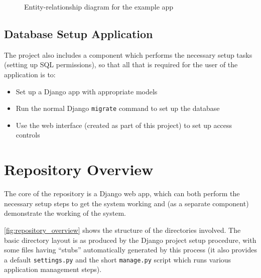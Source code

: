 \documentclass[12pt]{report}
\begin{document}
\begin{figure}[h]
\begin{center}
  \end{center}
  \caption{Entity-relationship diagram for the example app}
  \label{fig:entity-relationship}
\end{figure}

\subsection{Database Setup Application}
The project also includes a component which performs the necessary setup tasks (setting up SQL permissions), so that all that is required for the user of the application is to:
\begin{itemize}
\item
  Set up a Django app with appropriate models
\item
  Run the normal Django \texttt{migrate} command to set up the database
\item
  Use the web interface (created as part of this project) to set up access controls
\end{itemize}

\section{Repository Overview}
The core of the repository is a Django web app, which can both perform the necessary setup steps to get the system working and (as a separate component) demonstrate the working of the system.

\autoref{fig:repository_overview} shows the structure of the directories involved. The basic directory layout is as produced by the Django project setup procedure, with some files having ``stubs'' automatically generated by this process (it also provides a default \texttt{settings.py} and the short \texttt{manage.py} script which runs various application management steps).
\end{document}
